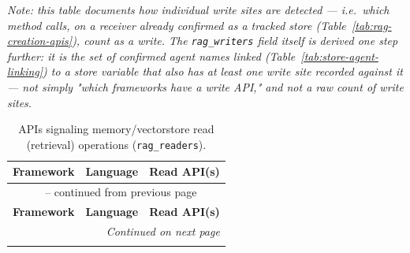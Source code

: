 \textit{Note: this table documents how individual write \emph{sites} are detected --- i.e.\ which method calls, on a receiver already confirmed as a tracked store (Table~\ref{tab:rag-creation-apis}), count as a write. The \texttt{rag\_writers} field itself is derived one step further: it is the set of confirmed \emph{agent names} linked (Table~\ref{tab:store-agent-linking}) to a store variable that also has at least one write site recorded against it --- not simply "which frameworks have a write API," and not a raw count of write sites.}


{\footnotesize
\renewcommand{\arraystretch}{0.9}
\begin{longtable}{@{}p{}p{}p{}@{}}
\caption{APIs signaling memory/vectorstore read (retrieval) operations (\texttt{rag\_readers}).}
\label{tab:rag-read-apis} \\
\toprule
\textbf{Framework} & \textbf{Language} & \textbf{Read API(s)} \\
\midrule
\endfirsthead
\multicolumn{3}{c}{\tablename\ \thetable{} -- continued from previous page} \\
\toprule
\textbf{Framework} & \textbf{Language} & \textbf{Read API(s)} \\
\midrule
\endhead
\midrule
\multicolumn{3}{r}{\textit{Continued on next page}} \\
\endfoot
\bottomrule
\endlastfoot


\end{longtable}}
